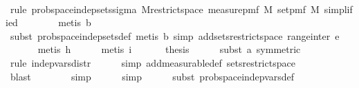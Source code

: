 \begin{isabellebody}
\ \ \ \ \isamarkupfalse%
\ {\isacharparenleft}{\kern0pt}rule\ prob{\isacharunderscore}{\kern0pt}space{\isachardot}{\kern0pt}indep{\isacharunderscore}{\kern0pt}sets{\isacharunderscore}{\kern0pt}sigma{\isacharbrackleft}{\kern0pt}\ M{\isacharequal}{\kern0pt}{\isachardoublequoteopen}restrict{\isacharunderscore}{\kern0pt}space\ {\isacharparenleft}{\kern0pt}measure{\isacharunderscore}{\kern0pt}pmf\ M{\isacharparenright}{\kern0pt}\ {\isacharparenleft}{\kern0pt}set{\isacharunderscore}{\kern0pt}pmf\ M{\isacharparenright}{\kern0pt}{\isachardoublequoteclose}{\isacharcomma}{\kern0pt}\ simplified{\isacharbrackright}{\kern0pt}{\isacharparenright}{\kern0pt}\isanewline
\ \ \ \ \ \ \isamarkupfalse%
\ {\isacharparenleft}{\kern0pt}metis\ b{\isacharparenright}{\kern0pt}\isanewline
\ \ \ \ \ \isamarkupfalse%
\ {\isacharparenleft}{\kern0pt}subst\ prob{\isacharunderscore}{\kern0pt}space{\isachardot}{\kern0pt}indep{\isacharunderscore}{\kern0pt}sets{\isacharunderscore}{\kern0pt}def{\isacharcomma}{\kern0pt}\ metis\ b{\isacharcomma}{\kern0pt}\ simp\ add{\isacharcolon}{\kern0pt}sets{\isacharunderscore}{\kern0pt}restrict{\isacharunderscore}{\kern0pt}space\ range{\isacharunderscore}{\kern0pt}inter\ e{\isacharparenright}{\kern0pt}\isanewline
\ \ \ \ \ \isamarkupfalse%
\ {\isacharparenleft}{\kern0pt}metis\ h{\isacharparenright}{\kern0pt}\isanewline
\ \ \ \ \isamarkupfalse%
\ {\isacharparenleft}{\kern0pt}metis\ i{\isacharparenright}{\kern0pt}\isanewline
\ \ \isanewline
\ \ \isamarkupfalse%
\ {\isacharquery}{\kern0pt}thesis\isanewline
\ \ \ \ \isamarkupfalse%
\ {\isacharparenleft}{\kern0pt}subst\ a\ {\isacharbrackleft}{\kern0pt}symmetric{\isacharbrackright}{\kern0pt}{\isacharparenright}{\kern0pt}\isanewline
\ \ \ \ \isamarkupfalse%
\ {\isacharparenleft}{\kern0pt}rule\ indep{\isacharunderscore}{\kern0pt}vars{\isacharunderscore}{\kern0pt}distr{\isacharparenright}{\kern0pt}\isanewline
\ \ \ \ \isamarkupfalse%
\ {\isacharparenleft}{\kern0pt}simp\ add{\isacharcolon}{\kern0pt}measurable{\isacharunderscore}{\kern0pt}def\ sets{\isacharunderscore}{\kern0pt}restrict{\isacharunderscore}{\kern0pt}space{\isacharparenright}{\kern0pt}\ \isanewline
\ \ \ \ \ \ \ \isamarkupfalse%
\ blast\isanewline
\ \ \ \ \ \ \isamarkupfalse%
\ simp\isanewline
\ \ \ \ \isamarkupfalse%
\ simp\isanewline
\ \ \ \ \isamarkupfalse%
\ {\isacharparenleft}{\kern0pt}subst\ prob{\isacharunderscore}{\kern0pt}space{\isachardot}{\kern0pt}indep{\isacharunderscore}{\kern0pt}vars{\isacharunderscore}{\kern0pt}def{}{\isacharparenright}{\kern0pt}\isanewline

\end{isabellebody}
